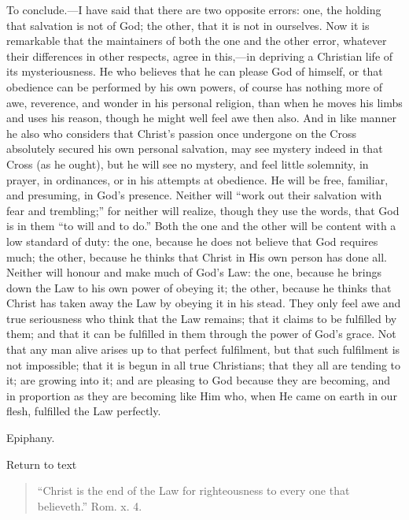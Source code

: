 To conclude.—I have said that there are two opposite errors: one,
the holding that salvation is not of God; the other, that it is not in
ourselves. Now it is remarkable that the maintainers of both the one
and the other error, whatever their differences in other respects,
agree in this,—in depriving a Christian life of its mysteriousness.
He who believes that he can please God of himself, or that obedience
can be performed by his own powers, of course has nothing more of awe,
reverence, and wonder in his personal religion, than when he moves his
limbs and uses his reason, though he might well feel awe then also.
And in like manner he also who considers that Christ's passion once
undergone on the Cross absolutely secured his own personal salvation,
may see mystery indeed in that Cross (as he ought), but he will see no
mystery, and feel little solemnity, in prayer, in ordinances, or in
his attempts at obedience. He will be free, familiar, and presuming,
in God's presence. Neither will ``work out their salvation with
fear and trembling;'' for neither will realize, though they use
the words, that God is in them ``to will and to do.'' Both the
one and the other will be content with a low standard of duty: the
one, because he does not believe that God requires much; the other,
because he thinks that Christ in His own person has done all. Neither
will honour and make much of God's Law: the one, because he brings
down the Law to his own power of obeying it; the other, because he
thinks that Christ has taken away the Law by obeying it in his stead.
They only feel awe and true seriousness who think that the Law
remains; that it claims to be fulfilled by them; and that it can be
fulfilled in them through the power of God's grace. Not that any man
alive arises up to that perfect fulfilment, but that such fulfilment
is not impossible; that it is begun in all true Christians; that they
all are tending to it; are growing into it; and are pleasing to God
because they are becoming, and in proportion as they are becoming like
Him who, when He came on earth in our flesh, fulfilled the Law
perfectly.


Epiphany.

Return to text


\begin{quote}

``Christ is the end of the Law for righteousness to every one
that believeth.'' Rom. x. 4.

\end{quote}

